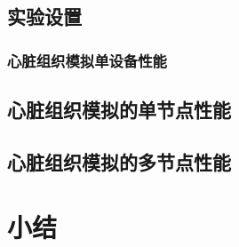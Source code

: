 \subsection{实验设置}

\subsubsection{心脏组织模拟单设备性能}

\subsection{心脏组织模拟的单节点性能}

\subsection{心脏组织模拟的多节点性能}

\section{小结}
